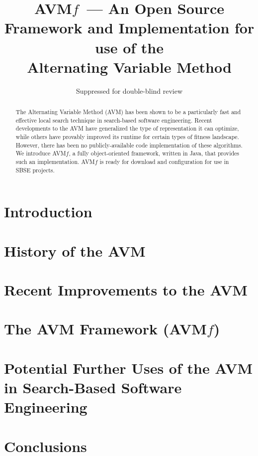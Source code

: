 \documentclass{llncs}
\newcommand{\name}{AVM\hspace{-1pt}$f$\xspace}
\begin{document}
\title{\name ~--- An Open Source Framework and Implementation for use of the \\ Alternating Variable Method}
\author{Suppressed for double-blind review}

\maketitle

\begin{abstract}
The Alternating Variable Method (AVM) has been shown to be a particularly fast and effective local search technique in search-based software engineering.%
%
Recent developments to the AVM have generalized the type of representation it can optimize, while others have provably improved its runtime for certain types of fitness landscape. However, there has been no publicly-available code implementation of these algorithms. We introduce \name, a  fully object-oriented framework, written in Java, that provides such an implementation. \name is ready for download and configuration for use in SBSE projects.

\end{abstract}

\section{Introduction}

\section{History of the AVM}

\section{Recent Improvements to the AVM}

\section{The AVM Framework (\name)}

\section{Potential Further Uses of the AVM in Search-Based Software Engineering}

\section{Conclusions}
\end{document}
